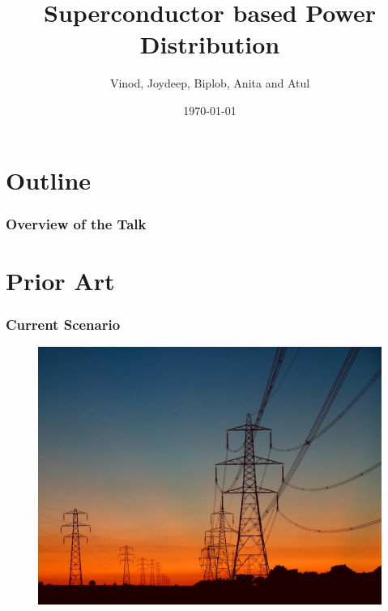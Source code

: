 \documentclass{beamer}
\title[Superconductor Power Distr.]{Superconductor based Power Distribution} %
\author{Vinod, Joydeep, Biplob, Anita and Atul} %
\institute[IISER M] %
{
Indian Institute of Science Education and Research Mohali \\ %
\medskip
}
\date{\today} %
\begin{document}
\begin{frame}
\titlepage %
\end{frame}


\section{Outline}
\begin{frame}
\frametitle{Overview of the Talk} %
\tableofcontents %
\end{frame}

\section{Prior Art}
		\begin{frame}
			\frametitle{Current Scenario}
				\begin{figure}
					\includegraphics[width=0.8\linewidth]{powerlines}
				\end{figure}
		\end{frame}
\end{document}
